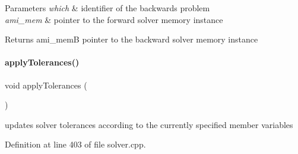 \begin{DoxyParams}{Parameters}
{\em which} & identifier of the backwards problem \\
\hline
{\em ami\+\_\+mem} & pointer to the forward solver memory instance \\
\hline
\end{DoxyParams}
\begin{DoxyReturn}{Returns}
ami\+\_\+memB pointer to the backward solver memory instance 
\end{DoxyReturn}
\mbox{\label{classamici_1_1_solver_a9819e5e5fa0d702721235eabd9e7c0e6}} 
\paragraph{\texorpdfstring{apply\+Tolerances()}{applyTolerances()}}
{\footnotesize\ttfamily void apply\+Tolerances (\begin{DoxyParamCaption}{ }\end{DoxyParamCaption})\hspace{0.3cm}{\ttfamily [protected]}}

updates solver tolerances according to the currently specified member variables 

Definition at line 403 of file solver.\+cpp.

